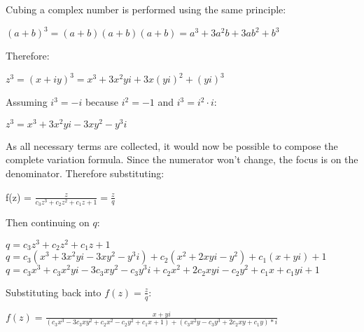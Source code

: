 \documentclass[]{article}
\begin{document}
\noindent Cubing a complex number is performed using the same principle:

\begin{flushleft}
	\hspace{20pt} $(a + b)^3 = (a + b)(a + b)(a + b) = a^3 + 3a^2b + 3ab^2 + b^3$
\end{flushleft}

\noindent Therefore:

\begin{flushleft}
	\hspace{20pt} $z^3 = (x + iy)^3 = x^3 + 3x^2yi + 3x(yi)^2 + (yi)^3$
\end{flushleft}

\noindent Assuming $i^3 = -i$ because $i^2 = -1$ and $i^3 = i^2 \cdot i$:

\begin{flushleft}
	\hspace{20pt} $z^3 = x^3 + 3x^2yi - 3xy^2 - y^3i$
\end{flushleft}

\noindent As all necessary terms are collected, it would now be possible to compose the complete variation formula. Since the numerator won't change, the focus is on the denominator. Therefore substituting:

\begin{flushleft}
	\hspace{20pt} f(z) = $\frac{z}{c_3z^3 + c_2z^2 + c_1z + 1} = \frac{z}{q}$
\end{flushleft}

\noindent Then continuing on $q$:

\begin{flushleft}
	\hspace{20pt} $q = c_3z^3 + c_2z^2 + c_1z + 1$ \\
	\medskip
	\hspace{20pt} $q = c_3(x^3 + 3x^2yi - 3xy^2 - y^3i) + c_2(x^2 + 2xyi - y^2) + c_1(x + yi) + 1$ \\
	\medskip
	\hspace{20pt} $q = c_3x^3 + c_3x^2yi - 3c_3xy^2 - c_3y^3i + c_2x^2 + 2c_2xyi - c_2y^2 + c_1x + c_1yi + 1 $
\end{flushleft}

\pagebreak

\noindent Substituting back into $f(z) = \frac{z}{q}$:

\begin{flushleft}
	\hspace{20pt} $f(z) = \frac{x + yi}{(c_3x^3 - 3c_3xy^2 + c_2x^2 - c_2y^2 + c_1x + 1) + (c_3x^2y - c_3y^3 + 2c_2xy + c_1y) * i}$ \\
\end{flushleft}
\end{document}
